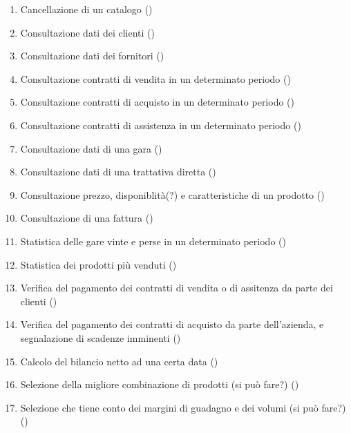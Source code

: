 \begin{enumerate}
  \item Cancellazione di un catalogo ()
  \item Consultazione dati dei clienti ()
  \item Consultazione dati dei fornitori ()
  \item Consultazione contratti di vendita in un determinato periodo ()
  \item Consultazione contratti di acquisto in un determinato periodo ()
  \item Consultazione contratti di assistenza in un determinato periodo ()
  \item Consultazione dati di una gara ()
  \item Consultazione dati di una trattativa diretta ()
  \item Consultazione prezzo, disponiblità(?) e caratteristiche di un prodotto ()
  \item Consultazione di una fattura ()
  \item Statistica delle gare vinte e perse in un determinato periodo ()
  \item Statistica dei prodotti più venduti ()
  \item Verifica del pagamento dei contratti di vendita o di assitenza da parte dei clienti ()
  \item Verifica del pagamento dei contratti di acquisto da parte dell'azienda, e segnalazione di scadenze imminenti ()
  \item Calcolo del bilancio netto ad una certa data ()
  \item Selezione della migliore combinazione di prodotti (si può fare?) ()
  \item Selezione che tiene conto dei margini di guadagno e dei volumi (si può fare?) ()

\end{enumerate}
